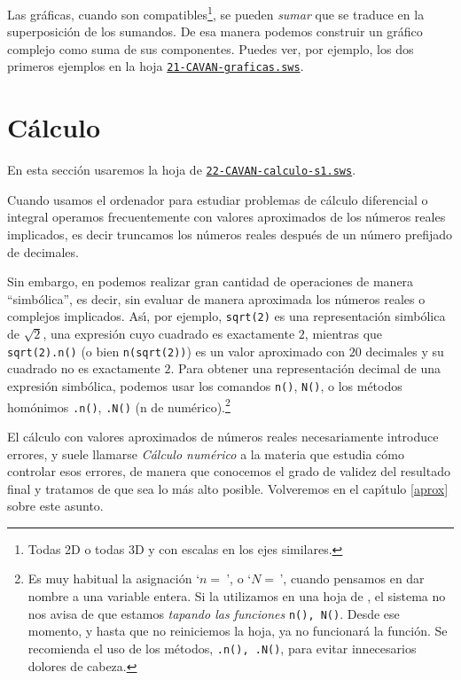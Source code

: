 Las gr\'aficas, cuando son compatibles\footnote{Todas 2D o todas 3D y con
escalas en los ejes similares.},  se pueden {\itshape sumar} que se traduce en
la superposici\'on de los sumandos. De esa manera podemos construir un gr\'afico
complejo como suma de sus componentes. Puedes ver, por ejemplo, los dos primeros
ejemplos en la hoja 
\href{http://sage.mat.uam.es:8888/home/pub/0/}{\tt 21-CAVAN-graficas.sws}.




\section{C\'alculo}


En esta secci\'on usaremos la hoja de {\sage} 
\href{http://sage.mat.uam.es:8888/home/pub/1/}{\tt 22-CAVAN-calculo-s1.sws}.

\medskip

Cuando usamos el ordenador para estudiar problemas de c\'alculo diferencial o
integral operamos frecuentemente con valores aproximados de los n\'umeros reales
implicados, es decir truncamos los n\'umeros reales despu\'es de un n\'umero
prefijado de decimales. 

Sin embargo, en {\sage} podemos realizar gran cantidad de operaciones de manera
``simb\'olica'', es decir,  sin evaluar de manera aproximada los n\'umeros
reales o complejos implicados. As\'{\i}, por ejemplo, \lstinline|sqrt(2)| es una
representaci\'on simb\'olica de $\sqrt{2}$, una expresi\'on cuyo cuadrado es
exactamente $2$,  mientras que  \lstinline|sqrt(2).n()| (o bien
\lstinline|n(sqrt(2))|) es un valor aproximado con $20$ decimales y su cuadrado
no es exactamente $2$.
\label{num}
Para obtener una
representación decimal de una expresión simbólica, podemos usar los comandos
\lstinline|n()|, \lstinline|N()|,  o los métodos homónimos \lstinline|.n()|,
\lstinline|.N()| (n de numérico).\footnote{Es muy
habitual la asignación `$n=\ $', o `$N=\,$', cuando pensamos en dar nombre a una
variable
entera. Si la utilizamos en una hoja de {\sage}, el sistema no nos avisa de que
estamos
\emph{tapando las funciones} \lstinline|n(), N()|. Desde ese momento, y hasta
que no
reiniciemos la hoja, ya no funcionará la función. Se recomienda el uso de los
métodos,
\lstinline|.n(), .N()|, para evitar innecesarios dolores de cabeza.}


El c\'alculo con valores aproximados de n\'umeros reales necesariamente
introduce errores, y suele llamarse {\itshape C\'alculo num\'erico} a la materia
que estudia c\'omo controlar esos errores, de manera que conocemos el grado de
validez del resultado final y tratamos de que sea lo m\'as alto posible. 
Volveremos en el cap\'{\i}tulo \ref{aprox} sobre este asunto. 

